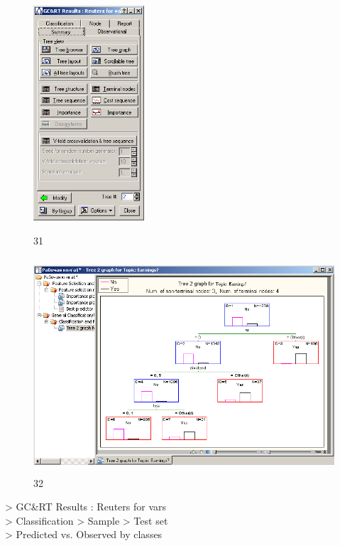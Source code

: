 \begin{figure}[!h]
  \centering

  \begin{minipage}{0.29\textwidth}
    \centering

    \includegraphics[height=8cm]
    {inc/var5/31.PNG}

    \caption{31}

    \label{fig:var5_31}
  \end{minipage}
  \begin{minipage}{0.69\textwidth}
    \centering

    \includegraphics[height=8cm]
    {inc/var5/32.PNG}

    \caption{32}

    \label{fig:var5_32}
  \end{minipage}
\end{figure}

> GC\&RT Results : Reuters for vars \\
> Classification > Sample > Test set \\
> Predicted vs. Observed by classes \\

